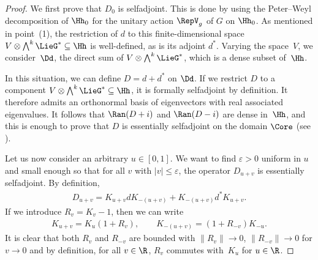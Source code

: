 \begin{proof}
We f\/irst prove that $D_0$ is selfadjoint. This is done by using the Peter--Weyl decomposition of $\Hh_0$ for the unitary action $\RepV_g$ of $G$ on $\Hh_0$. As mentioned in point~(1), %
the restriction of $d$ to this f\/inite-dimensional space $V \otimes \bigwedge^k \LieG^* \subseteq \Hh$ is well-def\/ined, as is its adjoint $d^*$. Varying the space~$V$, we consider~$\Dd$, the direct sum of $V \otimes \bigwedge^k \LieG^*$, which is a dense subset of~$\Hh$.

In this situation, we can def\/ine $D = d + d^*$ on $\Dd$. If we restrict $D$ to a component $V \otimes \bigwedge^k \LieG^* \subseteq \Hh$, it is formally selfadjoint by def\/inition. It therefore admits an orthonormal basis of eigenvectors with real associated eigenvalues. It follows that $\Ran(D +i)$ and $\Ran(D -i)$ are dense in~$\Hh$, and this is enough to prove that $D$ is essentially selfadjoint on the domain $\Core$ (see \cite[Corollary, p.~257]{ReedSimon1}).

Let us now consider an arbitrary $u \in [0,1]$. We want to f\/ind $\varepsilon > 0$ uniform in $u$ and small enough so that for all $v$ with $|v| \leqslant \varepsilon$, the operator $D_{u+v}$ is essentially selfadjoint. By def\/inition,
\begin{gather*}
D_{u+v} = K_{u+v} d K_{-(u+v)} + K_{-(u+v)} d^* K_{u+v}.
\end{gather*}
If we introduce $R_v = K_v -1$, then we can write
\begin{gather*}
K_{u+v} = K_u (1 + R_v),
\qquad
K_{-(u+v)} = (1 + R_{-v}) K_{-u}.
\end{gather*}
It is clear that both $R_v$ and $R_{-v}$ are bounded with $\|R_v \| \to 0$, $\|R_{-v} \| \to 0$ for $v \to 0$ and by def\/inition, for all $v \in \R$, $R_v$ commutes with~$K_u$ for $u \in \R$.


\end{proof}
